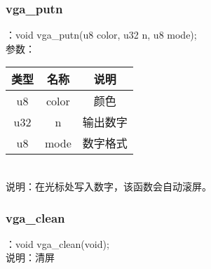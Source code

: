 \subsubsection{vga\_putn}
：void vga\_putn(u8 color, u32 n, u8 mode);\\
参数：\\
\begin{tabular}{|c|c|c|}
    \hline
    类型 & 名称 & 说明\\\hline
    u8 & color & 颜色\\\hline
    u32 & n & 输出数字\\\hline
    u8 & mode & 数字格式\\\hline
\end{tabular}\\
说明：在光标处写入数字，该函数会自动滚屏。

\subsubsection{vga\_clean}
：void vga\_clean(void);\\
说明：清屏